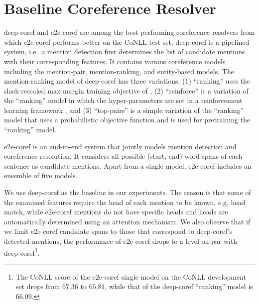 \section{Baseline Coreference Resolver}
deep-coref \cite{clarkkevin16a} and e2e-coref \cite{leekenton17} are among the best performing coreference resolvers 
from which e2e-coref performs better on the CoNLL test set.
deep-coref is a pipelined system, i.e.\ a mention detection first determines the list of candidate mentions with their corresponding features.
It contains various coreference models including the mention-pair, mention-ranking, and entity-based models.
The mention-ranking model of deep-coref has three variations: (1) ``ranking'' uses the slack-rescaled max-margin training objective of ,
(2) ``reinforce'' is a variation of the ``ranking'' model in which the hyper-parameters are set in a reinforcement learning framework \cite{sutton1998reinforcement},
and (3) ``top-pairs'' is a simple variation of the ``ranking'' model that uses a probabilistic objective function and is used for pretraining the ``ranking'' model. 

e2e-coref is an end-to-end system that jointly models mention detection and coreference resolution.
It considers all possible (start, end) word spans of each sentence as candidate mentions.
Apart from a single model, e2e-coref includes an ensemble of five models.

We use deep-coref as the baseline in our experiments.
The reason is that 
some of the examined features require the head of each mention to be known, e.g. head match, 
while e2e-coref mentions do not have specific heads and heads are automatically determined using an attention mechanism.
We also observe that if we limit e2e-coref candidate spans to those that correspond to deep-coref's detected mentions,
the performance of e2e-coref drops to a level on-par with deep-coref\footnote{
The CoNLL score of the e2e-coref single model on the CoNLL development set drops from $67.36$ to $65.81$, 
while that of the deep-coref ``ranking'' model is $66.09$.}.
%
